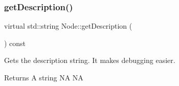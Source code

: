 \subsubsection{\texorpdfstring{get\+Description()}{getDescription()}\hspace{0.1cm}{\footnotesize\ttfamily [2/2]}}
{\footnotesize\ttfamily virtual std\+::string Node\+::get\+Description (\begin{DoxyParamCaption}{ }\end{DoxyParamCaption}) const\hspace{0.3cm}{\ttfamily [virtual]}}

Gets the description string. It makes debugging easier. \begin{DoxyReturn}{Returns}
A string  NA  NA 
\end{DoxyReturn}


